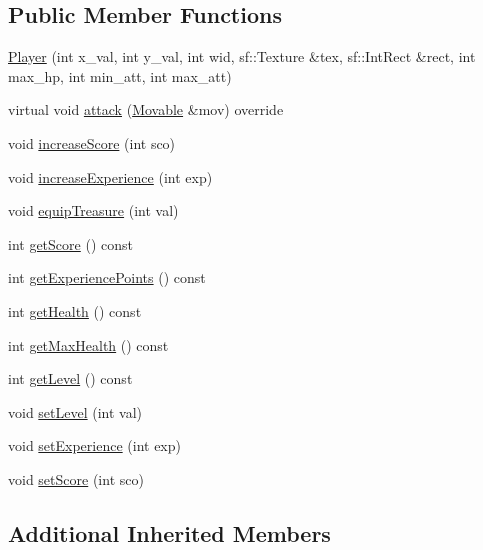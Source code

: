 \subsection*{Public Member Functions}
\begin{DoxyCompactItemize}
\item 
\hyperlink{classPlayer_a3d096a675cddfcb4d2f74201bf7e3422}{Player} (int x\+\_\+val, int y\+\_\+val, int wid, sf\+::\+Texture \&tex, sf\+::\+Int\+Rect \&rect, int max\+\_\+hp, int min\+\_\+att, int max\+\_\+att)
\item 
virtual void \hyperlink{classPlayer_a8135c6f5b7c11fa3aa1c801d0219356a}{attack} (\hyperlink{classMovable}{Movable} \&mov) override
\item 
void \hyperlink{classPlayer_ab68186aa09a4b86263ec6b238b7d75c4}{increase\+Score} (int sco)
\item 
void \hyperlink{classPlayer_a5de85f52562c1630b8eba16f8384cc5a}{increase\+Experience} (int exp)
\item 
void \hyperlink{classPlayer_a4ccbbd0bf0c7a811c7765ea1b8d83240}{equip\+Treasure} (int val)
\item 
int \hyperlink{classPlayer_ac10eb9fb0387f565134958d129585ac6}{get\+Score} () const 
\item 
int \hyperlink{classPlayer_a54051098b038fa4d040b5d316fb3587a}{get\+Experience\+Points} () const 
\item 
int \hyperlink{classPlayer_a3042adb49808b2629137f4d85b6b5fd3}{get\+Health} () const 
\item 
int \hyperlink{classPlayer_ac963622d4c47bd62f142fa1bc34d39f9}{get\+Max\+Health} () const 
\item 
int \hyperlink{classPlayer_a9a41d6af9786e15212a821072b0395b2}{get\+Level} () const 
\item 
void \hyperlink{classPlayer_a16abe3e019dec51bdcfb3175c6721ce5}{set\+Level} (int val)
\item 
void \hyperlink{classPlayer_a71f00c57a2c8490d1f2716e9cf8ed172}{set\+Experience} (int exp)
\item 
void \hyperlink{classPlayer_adac972269da71038ba2442d9323b5c16}{set\+Score} (int sco)
\end{DoxyCompactItemize}
\subsection*{Additional Inherited Members}


